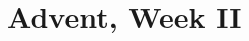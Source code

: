 \documentclass[12pt,twocolumn]{book}
\begin{document}







\chapter{Advent, Week II}


\end{document}
